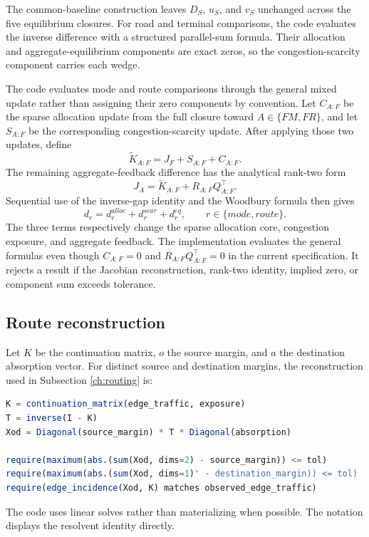 The common-baseline construction leaves \(D_S\), \(u_S\), and \(v_S\)
unchanged across the five equilibrium closures. For road and terminal
comparisons, the code evaluates the inverse difference with a structured
parallel-sum formula. Their allocation and aggregate-equilibrium components
are exact zeros, so the congestion-scarcity component carries each wedge.

The code evaluates mode and route comparisons through the general mixed
update rather than assigning their zero components by convention. Let
\(C_{A:F}\) be the sparse allocation update from the full closure toward
\(A\in\{FM,FR\}\), and let \(S_{A:F}\) be the corresponding
congestion-scarcity update. After applying those two updates, define
\[
 \widetilde K_{A:F}=J_F+S_{A:F}+C_{A:F}.
\]
The remaining aggregate-feedback difference has the analytical rank-two form
\[
 J_A=\widetilde K_{A:F}+R_{A:F}Q_{A:F}^{\top}.
\]
Sequential use of the inverse-gap identity and the Woodbury formula then gives
\[
 d_r=d_r^{alloc}+d_r^{scar}+d_r^{eq},
 \qquad r\in\{mode,route\}.
\]
The three terms respectively change the sparse allocation core, congestion
exposure, and aggregate feedback. The implementation evaluates the general
formulas even though \(C_{A:F}=0\) and
\(R_{A:F}Q_{A:F}^{\top}=0\) in the current specification. It rejects a result
if the Jacobian reconstruction, rank-two identity, implied zero, or component
sum exceeds tolerance.

\subsection{Route reconstruction}

Let \(K\) be the continuation matrix, \(o\) the source margin, and \(a\) the
destination absorption vector. For distinct source and destination margins,
the reconstruction used in Subsection \ref{ch:routing} is:
\begin{lstlisting}[language=Julia]
K = continuation_matrix(edge_traffic, exposure)
T = inverse(I - K)
Xod = Diagonal(source_margin) * T * Diagonal(absorption)

require(maximum(abs.(sum(Xod, dims=2) - source_margin)) <= tol)
require(maximum(abs.(sum(Xod, dims=1)' - destination_margin)) <= tol)
require(edge_incidence(Xod, K) matches observed_edge_traffic)
\end{lstlisting}
The code uses linear solves rather than materializing  when
possible. The notation displays the resolvent identity directly.

